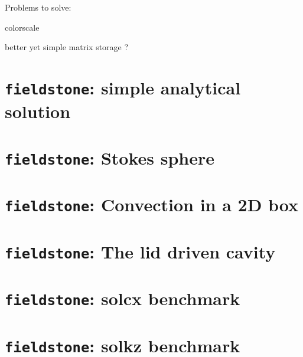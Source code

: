 \documentclass[a4paper]{article}
\begin{document}
\noindent Problems to solve:

colorscale 

better yet simple matrix storage ?


\newpage
\section{{\tt fieldstone}: simple analytical solution \label{f1}}


\newpage
\section{{\tt fieldstone}: Stokes sphere }


\newpage
\section{{\tt fieldstone}: Convection in a 2D box}


\newpage
\section{{\tt fieldstone}: The lid driven cavity}



\newpage
\section{{\tt fieldstone}: solcx benchmark}


\newpage
\section{{\tt fieldstone}: solkz benchmark}


\newpage
\end{document}
